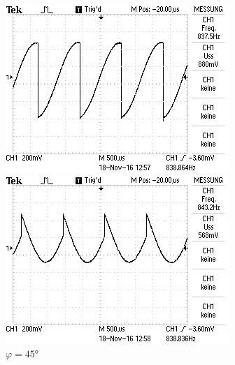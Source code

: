 \begin{figure}[!h]
\begin{minipage}[t]{0.3\textwidth}
\includegraphics[width=\textwidth]{Bilder/Rausch0.jpg}
\caption{$\varphi = 0\si{\degree}$}
\label{fig:7}
\end{minipage}
\hspace{10pt}
\vspace{5pt}
\begin{minipage}[t]{0.3\textwidth}
\includegraphics[width=\textwidth]{Bilder/Rausch120.jpg}
\caption{$\varphi = 45\si{\degree}$}
\label{fig:8}
\end{minipage}
\hspace{10pt}
\vspace{5pt}

\end{figure}
